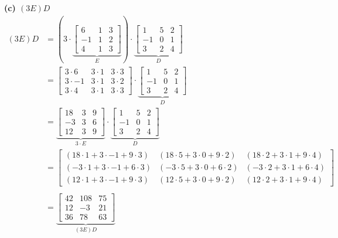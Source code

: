 \documentclass[a4paper,12pt]{article}
\begin{document}
\textbf{(c) $(3E)D$}
\begin{align*}
    (3E)D&= (3 \cdot
    \underbrace{
    \begin{bmatrix}
        6 & 1 & 3\\
        -1 & 1 & 2\\
        4 & 1 & 3
    \end{bmatrix}}_{E})
    \cdot
    \underbrace{
    \begin{bmatrix}
        1 & 5 & 2\\
        -1 & 0 & 1\\
        3 & 2 & 4
    \end{bmatrix}}_{D} \\
    &=
    \begin{bmatrix}
        3 \cdot 6 & 3 \cdot 1 & 3 \cdot 3\\
        3 \cdot -1 & 3 \cdot 1 & 3 \cdot 2\\
        3 \cdot 4 & 3 \cdot 1 & 3 \cdot 3
    \end{bmatrix}
    \cdot
    \underbrace{
    \begin{bmatrix}
        1 & 5 & 2\\
        -1 & 0 & 1\\
        3 & 2 & 4
    \end{bmatrix}}_{D} \\
    &=
    \underbrace{
    \begin{bmatrix}
        18 & 3 & 9\\
        -3 & 3 & 6\\
        12 & 3 & 9
    \end{bmatrix}}_{3 \cdot E}
    \cdot
    \underbrace{
    \begin{bmatrix}
        1 & 5 & 2\\
        -1 & 0 & 1\\
        3 & 2 & 4
    \end{bmatrix}}_{D} \\
    &=
    \begin{bmatrix}
        (18\cdot 1 + 3 \cdot -1 + 9 \cdot 3) & (18 \cdot 5 + 3 \cdot 0 + 9 \cdot 2) & (18 \cdot 2 + 3 \cdot 1 + 9 \cdot 4)\\
        (-3\cdot 1 + 3 \cdot -1 + 6 \cdot 3) & (-3 \cdot 5 + 3 \cdot 0 + 6 \cdot 2) & (-3 \cdot 2 + 3 \cdot 1 + 6 \cdot 4)\\
        (12\cdot 1 + 3 \cdot -1 + 9 \cdot 3) & (12 \cdot 5 + 3 \cdot 0 + 9 \cdot 2) & (12 \cdot 2 + 3 \cdot 1 + 9 \cdot 4)
    \end{bmatrix} \\ \\
    &=
    \underbrace{
    \begin{bmatrix}
        42 & 108 & 75\\
        12 & -3 & 21\\
        36 & 78 & 63
    \end{bmatrix}}_{(3E)D} 
\end{align*}
\end{document}
